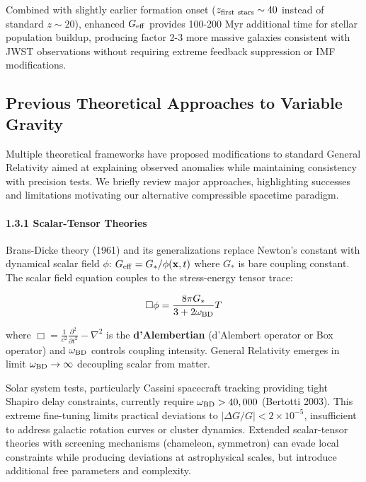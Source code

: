 \documentclass[11pt,a4paper]{article}
\begin{document}
Combined with slightly earlier formation onset
(\(z_{\rm first~stars} \sim 40\) instead of standard \(z \sim 20\)),
enhanced \(G_{\rm eff}\) provides 100-200 Myr additional time for
stellar population buildup, producing factor 2-3 more massive galaxies
consistent with JWST observations without requiring extreme feedback
suppression or IMF modifications.

\hypertarget{previous-theoretical-approaches-to-variable-gravity}{%
\subsection{Previous Theoretical Approaches to Variable
Gravity}\label{previous-theoretical-approaches-to-variable-gravity}}

Multiple theoretical frameworks have proposed modifications to standard
General Relativity aimed at explaining observed anomalies while
maintaining consistency with precision tests. We briefly review major
approaches, highlighting successes and limitations motivating our
alternative compressible spacetime paradigm.

\hypertarget{scalar-tensor-theories}{%
\paragraph{1.3.1 Scalar-Tensor Theories}\label{scalar-tensor-theories}}

Brans-Dicke theory (1961) and its generalizations replace Newton's
constant with dynamical scalar field \(\phi\):
\(G_{\rm eff} = G_*/\phi({\bf x},t)\) where \(G_*\) is bare coupling
constant. The scalar field equation couples to the stress-energy tensor
trace:

\[\Box\phi = \frac{8\pi G_*}{3 + 2\omega_{\rm BD}} T\]

where \(\Box = \frac{1}{c^2}\frac{\partial^2}{\partial t^2} - \nabla^2\)
is the \textbf{d'Alembertian} (d'Alembert operator or Box operator) and
\(\omega_{\rm BD}\) controls coupling intensity. General Relativity
emerges in limit \(\omega_{\rm BD} \to \infty\) decoupling scalar from
matter.

Solar system tests, particularly Cassini spacecraft tracking providing
tight Shapiro delay constraints, currently require
\(\omega_{\rm BD} > 40,000\) (Bertotti 2003). This extreme fine-tuning
limits practical deviations to \(|\Delta G/G| < 2 \times 10^{-5}\),
insufficient to address galactic rotation curves or cluster dynamics.
Extended scalar-tensor theories with screening mechanisms (chameleon,
symmetron) can evade local constraints while producing deviations at
astrophysical scales, but introduce additional free parameters and
complexity.
\end{document}
